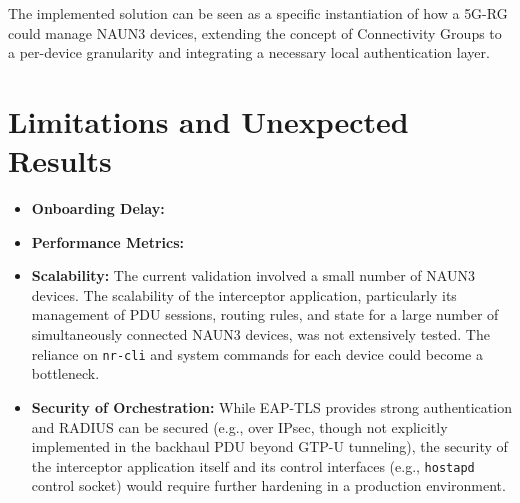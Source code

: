 The implemented solution can be seen as a specific instantiation of how a \ac{5G-RG} could manage \ac{NAUN3} devices, extending the concept of Connectivity Groups to a per-device granularity and integrating a necessary local authentication layer.

\section{Limitations and Unexpected Results}

\begin{itemize}
    \item \textbf{Onboarding Delay:} %

    \item \textbf{Performance Metrics:} %

    \item \textbf{Scalability:} The current validation involved a small number of \ac{NAUN3} devices. The scalability of the interceptor application, particularly its management of \ac{PDU} sessions, routing rules, and state for a large number of simultaneously connected \ac{NAUN3} devices, was not extensively tested. The reliance on \texttt{nr-cli} and system commands for each device could become a bottleneck.

    \item \textbf{Security of Orchestration:} While \ac{EAP-TLS} provides strong authentication and \ac{RADIUS} can be secured (e.g., over \ac{IPsec}, though not explicitly implemented in the backhaul \ac{PDU} beyond \ac{GTP-U} tunneling), the security of the interceptor application itself and its control interfaces (e.g., \texttt{hostapd} control socket) would require further hardening in a production environment.


\end{itemize}
